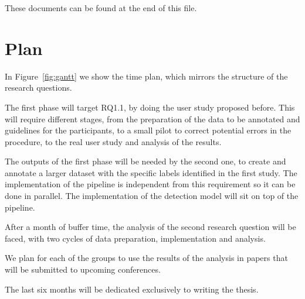 These documents can be found at the end of this file.






\section{Plan}


In Figure~\ref{fig:gantt} we show the time plan, which mirrors the structure of the research questions.

The first phase will target RQ1.1, by doing the user study proposed before. This will require different stages, from the preparation of the data to be annotated and guidelines for the participants, to a small pilot to correct potential errors in the procedure, to the real user study and analysis of the results.

The outputs of the first phase will be needed by the second one, to create and annotate a larger dataset with the specific labels identified in the first study. The implementation of the pipeline is independent from this requirement so it can be done in parallel. The implementation of the detection model will sit on top of the pipeline.

After a month of buffer time, the analysis of the second research question will be faced, with two cycles of data preparation, implementation and analysis.

We plan for each of the groups to use the results of the analysis in papers that will be submitted to upcoming conferences.

The last six months will be dedicated exclusively to writing the thesis.

